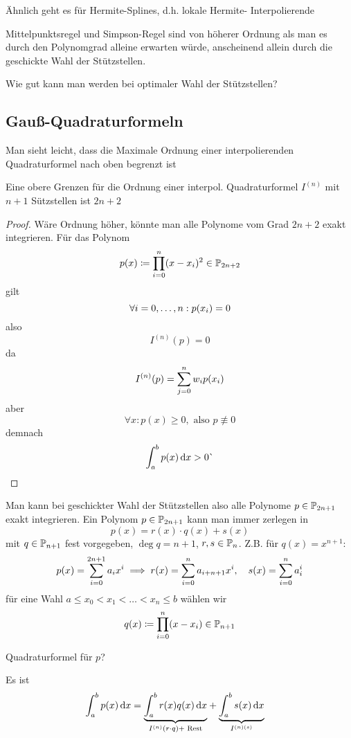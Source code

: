 \documentclass[11pt,a4paper,oneside]{scrartcl}
\begin{document}
\begin{remark}
    Ähnlich geht es für Hermite-Splines, d.h. lokale Hermite-
    Interpolierende
\end{remark}
\begin{motivation}
    Mittelpunktsregel und Simpson-Regel sind von höherer Ordnung als 
    man es durch 
    den Polynomgrad alleine erwarten würde, anscheinend allein durch 
    die 
    geschickte Wahl der Stützstellen. 
\end{motivation}
\begin{question}
    Wie gut kann man werden bei optimaler Wahl der Stützstellen?
\end{question}
\subsection{Gauß-Quadraturformeln}
Man sieht leicht, dass die Maximale Ordnung einer interpolierenden 
Quadraturformel nach oben begrenzt ist
\begin{lemma}
    Eine obere Grenzen für die Ordnung einer interpol. Quadraturformel 
    $I^{(n)}$ 
    mit $n+1$ Sützstellen ist $2n+2$
\end{lemma}
\begin{proof}
    Wäre Ordnung höher, könnte man alle Polynome vom Grad $2n+2$ exakt 
    integrieren. Für das Polynom \[
        p(x) \coloneqq \prod_{i=0}^n(x-x_i)^2 \in \mathbb{P}_{2n+2}
    \]
    gilt \[
    \forall i = 0,\dots, n: p(x_i) = 0
    \]
    also \[
        I^{(n)}(p) = 0
    \]
    da \[
        I^{(n)}(p) = \displaystyle\sum_{j=0}^n w_ip(x_i)
    \]
    aber \[
    \forall x: p(x) \geq 0, \text{ also }p\not\equiv 0
    \]  
    demnach \[
        \int_a^b p(x)\mathop{}\!\mathrm{d} x > 0 \lightning
    \]    
\end{proof}
Man kann bei geschickter Wahl der Stützstellen also alle Polynome $p\in\mathbb{P}_{2n+1}$ exakt integrieren.
Ein Polynom $p\in\mathbb{P}_{2n+1}$ kann man immer zerlegen in \[
    p(x) = r(x) \cdot q(x) + s(x)\]
mit $q\in \mathbb{P}_{n+1}$ fest vorgegeben, $\deg{q} = n+1$, $r,s\in \mathbb{P}_n$.
Z.B. für $q(x) =x^{n+1}$: \[
    p(x) = \displaystyle\sum_{i=0}^{2n+1}a_ix^i \implies r(x) = \sum_{i=0}^n a_{i+n+1}x^i, \hspace{1em} s(x) = \sum_{i=0}^na_i^i\]
für eine Wahl $a \leq x_0 < x_1 < \dots < x_n \leq b$ wählen wir \[
    q(x) \coloneqq \prod_{i=0}^n(x-x_i) \in \mathbb{P}_{n+1}\]
\begin{question}Quadraturformel für $p$?
\end{question}
Es ist \begin{align*}
    \int_a^b p(x) \mathop{}\!\mathrm{d} x &= \underset{I^{(n)}(r\cdot q) + \text{ Rest}}{\underbrace{\int_a^b r(x) q(x) \mathop{}\!\mathrm{d} x}} + \underset{I^{(n)(s)}}{\underbrace{\int_a^b s(x)\mathop{}\!\mathrm{d} x}}
\end{align*}
\end{document}
